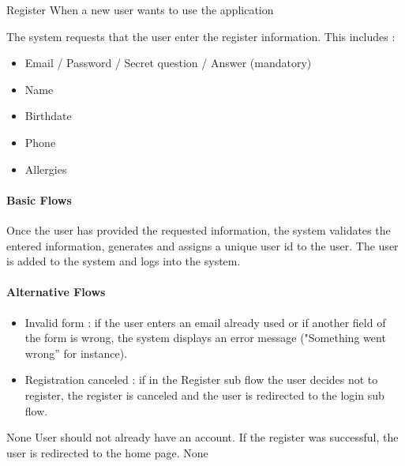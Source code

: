 \subusecasedesc
{Register}
{When a new user wants to use the application}
{
  The system requests that the user enter the register information. This includes :
  \begin{itemize}
    \item Email / Password / Secret question / Answer (mandatory)
    \item Name
    \item Birthdate
    \item Phone
    \item Allergies
  \end{itemize}

  \paragraph{Basic Flows}
  Once the user has provided the requested information, the system validates the entered information, generates and assigns a unique user id to the user. The user is added to the system and logs into the system.
  \paragraph{Alternative Flows}
  \begin{itemize}
    \item Invalid form : if the user enters an email already used or if another field of the form is wrong, the system displays an error message ("Something went wrong” for instance).
    \item Registration canceled : if in the Register sub flow the user decides not to register, the register is canceled and the user is redirected to the login sub flow.
  \end{itemize}
}
{None}
{User should not already have an account.}
{If the register was successful, the user is redirected to the home page.}
{None}

